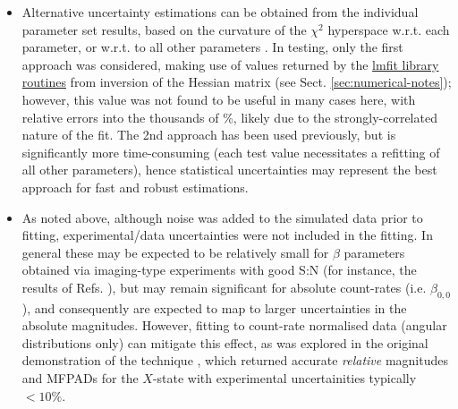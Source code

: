 \documentclass[10pt]{article}
\begin{document}
\begin{itemize}
\item Alternative uncertainty estimations can be obtained from the individual parameter set results, based on the curvature of the $\chi^2$ hyperspace w.r.t. each parameter, or w.r.t. to all other parameters \cite{HockettThesis,Bevington1992}. In testing, only the first approach was considered, making use of values returned by the \href{https://lmfit.github.io/lmfit-py/fitting.html#uncertainties-in-variable-parameters-and-their-correlations}{lmfit library routines} \cite{LMFITDocumentation} from inversion of the Hessian matrix (see Sect. \ref{sec:numerical-notes}); however, this value was not found to be useful in many cases here, with relative errors into the thousands of \%, likely due to the strongly-correlated nature of the fit. The 2nd approach has been used previously, but is significantly more time-consuming (each test value necessitates a refitting of all other parameters), hence statistical uncertainties may represent the best approach for fast and robust estimations.
\item As noted above, although noise was added to the simulated data prior to fitting, experimental/data uncertainties were not included in the fitting. In general these may be expected to be relatively small for $\beta$ parameters obtained via imaging-type experiments with good S:N (for instance, the results of Refs. \cite{HockettThesis,marceau2017MolecularFrameReconstruction}), but may remain significant for absolute count-rates (i.e. $\beta_{0,0}$), and consequently are expected to map to larger uncertainties in the absolute magnitudes. However, fitting to count-rate normalised data (angular distributions only) can mitigate this effect, as was explored in the original demonstration of the technique \cite{marceau2017MolecularFrameReconstruction}, which returned accurate \textit{relative} magnitudes and MFPADs for the $X$-state with experimental uncertainities typically $<10\%$.
\end{itemize}




\end{document}
